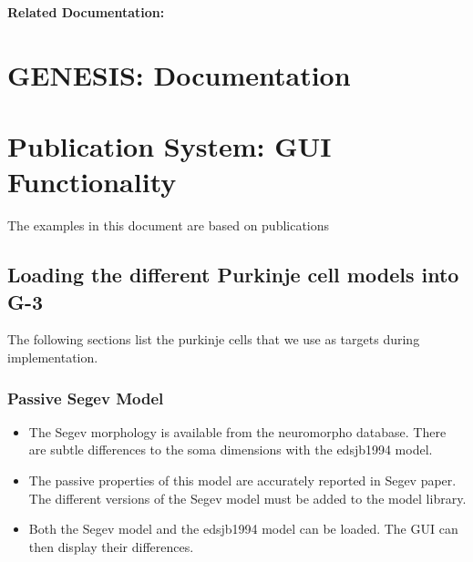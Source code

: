 \documentclass[12pt]{article}
\begin{document}
{\bf Related Documentation:}

\section*{GENESIS: Documentation}

\section{Publication System: GUI Functionality}






The examples in this document are based on publications
\cite{deschutter94:_purkin_i}\cite{deschutter94:_purkin_ii}\cite{schutter94:_simul_purkin}\cite{Rapp-P:1994qf}

\subsection{Loading the different Purkinje cell models into G-3}

The following sections list the purkinje cells that we use as targets
during implementation.

\subsubsection{Passive Segev Model}
\begin{itemize}
\item The Segev morphology is available from the
  neuromorpho database.  There are subtle differences to the soma
  dimensions with the edsjb1994 model.
\item The passive properties of this model are accurately reported in
  Segev paper.  The different versions of the Segev model must be
  added to the model library.
\item Both the Segev model and the edsjb1994 model can be loaded.  The
  GUI can then display their differences.
\end{itemize}
\end{document}
